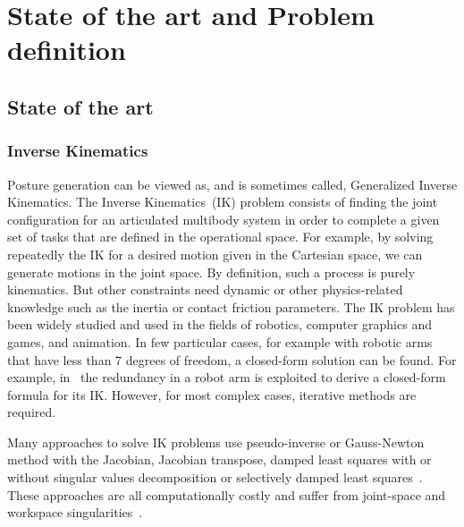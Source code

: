 
\chapter{State of the art and Problem definition}
\label{cha:state_of_the_art_and_problem_definition}

\graphicspath{{Chapter1-State-of-the-art/Figs/}}

\section{State of the art}
\label{sec:state_of_the_art}

\subsection{Inverse Kinematics}
\label{sub:inverse_kinematics}

Posture generation can be viewed as, and is sometimes called, Generalized Inverse Kinematics.
The Inverse Kinematics~(IK) problem consists of finding the joint configuration for an articulated multibody system in order to complete a given set of tasks that are defined in the operational space.
For example, by solving repeatedly the IK for a desired motion given in the Cartesian space, we can generate motions in the joint space.
By definition, such a process is purely kinematics. But other constraints need dynamic or other physics-related knowledge such as the inertia or contact friction parameters.
The IK problem has been widely studied and used in the fields of robotics, computer graphics and games, and animation.
In few particular cases, for example with robotic arms that have less than 7 degrees of freedom, a closed-form solution can be found.
For example, in~\cite{asfour2003human} the redundancy in a robot arm is exploited to derive a closed-form formula for its IK.
However, for most complex cases, iterative methods are required.


Many approaches to solve IK problems use pseudo-inverse or Gauss-Newton method with the Jacobian, Jacobian transpose, damped least squares with or without singular values decomposition or selectively damped least squares~\cite{balestrino1984robust, tolani2000real, baillieul1985kinematic, wampler1986manipulator, nakamura1986inverse, buss2005selectively}.
These approaches are all computationally costly and suffer from joint-space and workspace singularities~\cite{aristidou2009inverse}.

